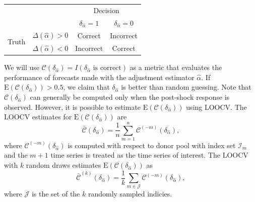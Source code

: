\documentclass[11pt]{article}
\def\mc#1{\mathcal{#1}} %
\def\E#1{\mathrm{E}(#1)} %
\theoremstyle{definition}
\begin{document}
\begin{center}
  \begin{center}
      \begin{tabular}{cc|c|c}
        \hline
        & & \multicolumn{2}{c}{Decision} \\
        & & $\delta_{\hat{\alpha}} = 1$ & $\delta_{\hat{\alpha}} = 0$ \\ 
                \hline
     \multirow{2}{*}{Truth}  & $\Delta(\hat{\alpha})>0$ & Correct & Incorrect \\
      \cline{3-4}
      & $\Delta(\hat{\alpha})<0$  & Incorrect & Correct \\
      \hline
      \end{tabular}
  \end{center}
\end{center}
\vspace*{0.3cm}


We will use 
$
	\mc{C}(\delta_{\hat\alpha}) 
	= I(\delta_{\hat{\alpha}} \text{ is correct})
$
as a metric that evaluates the performance of forecasts made with the adjustment estimator $\hat\alpha$. If $\E{\mc{C}(\delta_{\hat{\alpha}})} > 0.5$, we claim that $\delta_{\hat{\alpha}}$ is better than random guessing. Note that $\mc{C}(\delta_{\hat{\alpha}})$ can generally be computed only when the post-shock response is observed. However, it is possible to estimate $\E{\mc{C}(\delta_{\hat{\alpha}})}$ using LOOCV. %
The LOOCV estimates for $\E{\mc{C}(\delta_{\hat{\alpha}})}$ are
\begin{equation} \label{loocvm}
	 \bar{\mc{C}}(\delta_{\hat{\alpha}})= \frac{1}{n} \sum_{m = 1}^n \mc{C}^{(-m)}(\delta_{\hat{\alpha}}),
	\end{equation}
where $\mc{C}^{(-m)}(\delta_{\hat{\alpha}})$ is computed with respect to donor pool with index set $\mc{I}_m$ and the $m+1$ time series is treated as the time series of interest.  The LOOCV with $k$ random draws estimates $\E{\mc{C}(\delta_{\hat{\alpha}})}$ as
\begin{equation} \label{loocvk}
	 \bar{\mc{C}}^{(k)}(\delta_{\hat{\alpha}})= \frac{1}{k} \sum_{m \in \mc{J}} \mc{C} ^{(-m)}(\delta_{\hat{\alpha}})	,
\end{equation}
where $\mc{J}$ is the set of the $k$ randomly sampled indicies. %
\end{document}
